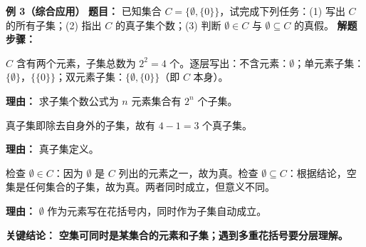 \begin{examplebox}
	\medskip
	\textbf{\textcolor{CExample}{例 3（综合应用）}}
	\textbf{\textcolor{CExample}{题目：}}
	已知集合 $C = \{ \emptyset, \{ 0 \} \}$，试完成下列任务：(1) 写出 $C$ 的所有子集；(2) 指出 $C$ 的真子集个数；(3) 判断 $\emptyset \in C$ 与 $\emptyset \subseteq C$ 的真假。
	\textbf{\textcolor{CExample}{解题步骤：}}
	\begin{description}[style=nextline, leftmargin=2.8em, labelsep=0.5em, itemsep=0.45em]
		\item[\textbf{第一步（列举子集）：}]
			$C$ 含有两个元素，子集总数为 $2^2 = 4$ 个。逐层写出：不含元素：$\emptyset$；单元素子集：$\{ \emptyset \}$，$\{ \{ 0 \} \}$；双元素子集：$\{ \emptyset, \{ 0 \} \}$（即 $C$ 本身）。
			\par\textbf{理由：} 求子集个数公式为 $n$ 元素集合有 $2^n$ 个子集。
		\item[\textbf{第二步（辨别真子集）：}]
			真子集即除去自身外的子集，故有 $4-1=3$ 个真子集。
			\par\textbf{理由：} 真子集定义。
		\item[\textbf{第三步（区分子集与属于）：}]
			检查 $\emptyset \in C$：因为 $\emptyset$ 是 $C$ 列出的元素之一，故为真。检查 $\emptyset \subseteq C$：根据结论，空集是任何集合的子集，故为真。两者同时成立，但意义不同。
			\par\textbf{理由：} $\emptyset$ 作为元素写在花括号内，同时作为子集自动成立。
	\end{description}
	\textbf{\textcolor{CExample}{关键结论：}}
	\textbf{空集可同时是某集合的元素和子集；遇到多重花括号要分层理解。}
\end{examplebox}
